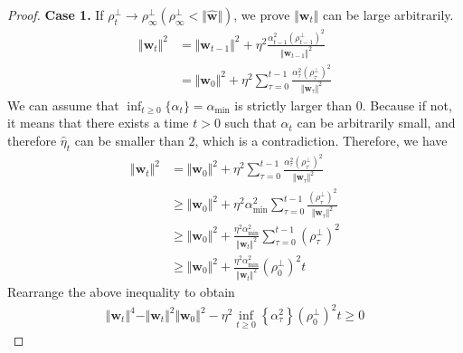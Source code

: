 \documentclass[pdflatex,sn-basic]{sn-jnl}%
\theoremstyle{thmstyleone}%
\begin{document}
\begin{appendices}
\begin{proof}
  \noindent \textbf{Case 1.} 
  If $\rho_t^{\perp} \rightarrow \rho_{\infty}^{\perp} ( \rho_{\infty}^{\perp} < \Vert \hat{\mathbf{w}}\Vert)$, 
  we prove $\Vert \mathbf{w}_t \Vert$ can be large arbitrarily. 
  \begin{equation*}
  \begin{aligned}
    \Vert \mathbf{w}_t \Vert^{2} 
    & = \Vert \mathbf{w}_{t-1} \Vert^2 + \eta^{2} \frac{\alpha_{t-1}^2 \left(\rho_{t-1}^{\perp}\right)^2 }{\Vert \mathbf{w}_{t-1} \Vert^2}
    \\ & =
    \Vert \mathbf{w}_{0} \Vert^2 + \eta^{2} \sum_{\tau=0}^{t-1} \frac{\alpha_{\tau}^2 \left(\rho_{\tau}^{\perp}\right)^2 }{\Vert \mathbf{w}_{\tau} \Vert^2}
  \end{aligned}
  \end{equation*}
  We can assume that $\inf_{t \ge 0} \{\alpha_t\} = \alpha_{\min}$ is strictly larger than $0$. 
  Because if not, it means that there exists a time $t > 0$ such that $\alpha_t$ can be arbitrarily small, 
  and therefore $\hat{\eta}_t$ can be smaller than $2$, which is a contradiction. 
  Therefore, we have 
  \begin{equation*}
    \begin{aligned}
      \Vert \mathbf{w}_t \Vert^{2} 
      & =
      \Vert \mathbf{w}_{0} \Vert^2 + \eta^{2} \sum_{\tau=0}^{t-1} \frac{\alpha_{\tau}^2 \left(\rho_{\tau}^{\perp}\right)^2 }{\Vert \mathbf{w}_{\tau} \Vert^2}
      \\ & \ge 
      \Vert \mathbf{w}_{0} \Vert^2 + \eta^{2} \alpha_{\min}^2 \sum_{\tau=0}^{t-1} \frac{ \left(\rho_{\tau}^{\perp}\right)^2 }{\Vert \mathbf{w}_{\tau} \Vert^2}
      \\ & \ge 
      \Vert \mathbf{w}_{0} \Vert^2 + 
      \frac{ \eta^{2} \alpha_{\min}^2 }{\Vert \mathbf{w}_{t} \Vert^2}
      \sum_{\tau=0}^{t-1} \left(\rho_{\tau}^{\perp}\right)^2
      \\ & \ge 
      \Vert \mathbf{w}_{0} \Vert^2 + 
      \frac{ \eta^{2} \alpha_{\min}^2 }{\Vert \mathbf{w}_{t} \Vert^2}
      \left(\rho_{0}^{\perp}\right)^2  t
    \end{aligned}
    \end{equation*}
    Rearrange the above inequality to obtain 
    \begin{equation*}
    \begin{aligned}
      \Vert \mathbf{w}_t \Vert^{4} - \Vert \mathbf{w}_{t} \Vert^2 \Vert \mathbf{w}_{0} \Vert^2 -
      \eta^{2} \inf_{t \ge 0} \left\{\alpha_{\tau}^2\right\}
      \left(\rho_{0}^{\perp}\right)^2  t
      \ge 0
    \end{aligned}

\end{equation*}
\end{proof}
\end{appendices}
\end{document}
